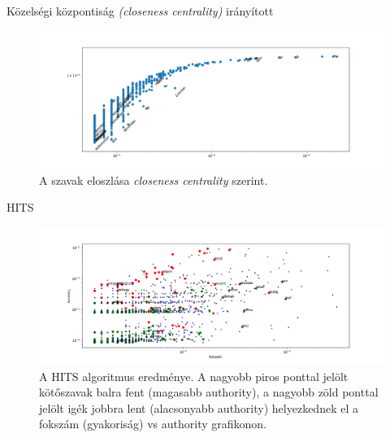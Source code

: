 \documentclass{beamer}
\newlength{\twocolwid}
\begin{document}
\begin{frame}[t]
\begin{columns}[t]
          \begin{column}{\twocolwid} %
            \begin{block}{Közelségi központiság \emph{(closeness centrality)}} irányított \end{block}
              \begin{figure}[h]
                \begin{center}
                  \includegraphics[width=\columnwidth]{current-flow-closeness.png}
                  \caption{A szavak eloszlása \emph{closeness centrality} szerint.}
                \end{center}
                \label{fig:closeness}
              \end{figure}
            \begin{block}{HITS} \end{block}
              \begin{figure}[h]
                \begin{center}
                  \includegraphics[width=\columnwidth]{conj-verb-auth.png}
                  \caption{A HITS algoritmus eredménye.
                  A nagyobb piros ponttal jelölt kötőszavak balra fent
                  (magasabb authority),
                  a nagyobb zöld ponttal jelölt igék jobbra lent
                  (alacsonyabb authority)
                  helyezkednek el
                  a fokszám (gyakoriság) vs authority grafikonon.}
                \end{center}
                \label{fig:hits-auth}
              \end{figure}
          \end{column}


\end{columns}
\end{frame}
\end{document}
